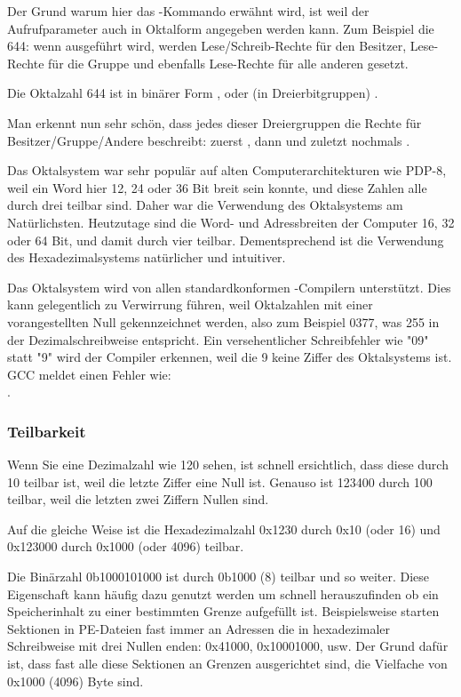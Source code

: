 Der Grund warum hier das -Kommando erwähnt wird, ist weil der Aufrufparameter auch in Oktalform angegeben werden kann.
Zum Beispiel die 644: wenn  ausgeführt wird, werden Lese/Schreib-Rechte für den Besitzer, Lese-Rechte für
die Gruppe und ebenfalls Lese-Rechte für alle anderen gesetzt.

Die Oktalzahl 644 ist in binärer Form , oder (in Dreierbitgruppen) .

Man erkennt nun sehr schön, dass jedes dieser Dreiergruppen die Rechte für Besitzer/Gruppe/Andere beschreibt:
zuerst  , dann  und zuletzt nochmals .

Das Oktalsystem war sehr populär auf alten Computerarchitekturen wie PDP-8, weil ein Word hier 12, 24 oder 36 Bit breit sein konnte,
und diese Zahlen alle durch drei teilbar sind. Daher war die Verwendung des Oktalsystems am Natürlichsten.
Heutzutage sind die Word- und Adressbreiten der Computer 16, 32 oder 64 Bit, und damit durch vier teilbar. Dementsprechend ist die
Verwendung des Hexadezimalsystems natürlicher und intuitiver.

Das Oktalsystem wird von allen standardkonformen \CCpp-Compilern unterstützt.
Dies kann gelegentlich zu Verwirrung führen, weil Oktalzahlen mit einer vorangestellten Null gekennzeichnet werden,
also zum Beispiel 0377, was 255 in der Dezimalschreibweise entspricht.
Ein versehentlicher Schreibfehler wie "09" statt "9" wird der Compiler erkennen, weil die 9 keine Ziffer des Oktalsystems ist.
GCC meldet einen Fehler wie:\\
.

\subsubsection{Teilbarkeit}

Wenn Sie eine Dezimalzahl wie 120 sehen, ist schnell ersichtlich, dass diese durch 10 teilbar ist, weil die letzte Ziffer eine Null ist.
Genauso ist 123400 durch 100 teilbar, weil die letzten zwei Ziffern Nullen sind.

Auf die gleiche Weise ist die Hexadezimalzahl 0x1230 durch 0x10 (oder 16) und 0x123000 durch 0x1000 (oder 4096) teilbar.

Die Binärzahl 0b1000101000 ist durch 0b1000 (8) teilbar und so weiter.
Diese Eigenschaft kann häufig dazu genutzt werden um schnell herauszufinden ob ein Speicherinhalt zu einer bestimmten Grenze
aufgefüllt ist. Beispielsweise starten Sektionen in \ac{PE}-Dateien fast immer an Adressen die in hexadezimaler Schreibweise
mit drei Nullen enden: 0x41000, 0x10001000, usw.
Der Grund dafür ist, dass fast alle diese Sektionen an Grenzen ausgerichtet sind, die Vielfache von 0x1000 (4096) Byte sind.

